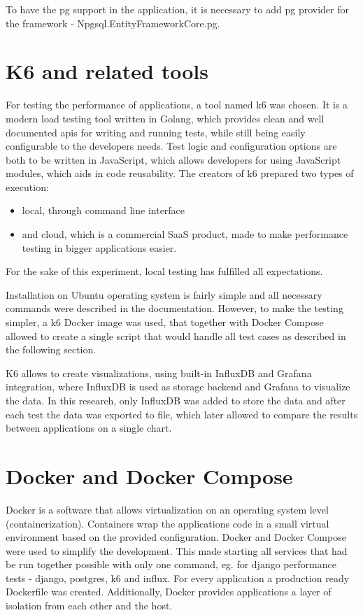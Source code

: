 To have the \acrlong{pg} support in the application, it is necessary to add \acrshort{pg} provider for the framework - Npgsql.EntityFrameworkCore.\acrlong{pg}.

\section{K6 and related tools}

For testing the performance of applications, a tool named k6 was chosen. It is a modern load testing tool written in Golang, which provides clean and well documented \acrshort{api}s for writing and running tests, while still being easily configurable to the developers needs. Test logic and configuration options are both to be written in JavaScript, which allows developers for using JavaScript modules, which aids in code reusability. The creators of k6 prepared two types of execution:
\begin{itemize}
  \item local, through command line interface
  \item and cloud, which is a commercial SaaS product, made to make performance testing in bigger applications easier.
\end{itemize}
For the sake of this experiment, local testing has fulfilled all expectations.

Installation on Ubuntu operating system is fairly simple and all necessary commands were described in the documentation. However, to make the testing simpler, a k6 Docker image was used, that together with Docker Compose allowed to create a single script that would handle all test cases as described in the following section.

K6 allows to create visualizations, using built-in InfluxDB and Grafana integration, where InfluxDB is used as storage backend and Grafana to visualize the data. In this research, only InfluxDB was added to store the data and after each test the data was exported to file, which later allowed to compare the results between applications on a single chart.

\section{Docker and Docker Compose}

Docker is a software that allows virtualization on an operating system level (containerization). Containers wrap the applications code in a small virtual environment based on the provided configuration. Docker and Docker Compose were used to simplify the development. This made starting all services that had be run together possible with only one command, eg. for django performance tests - django, postgres, k6 and influx. For every application a production ready Dockerfile was created. Additionally, Docker provides applications a layer of isolation from each other and the host.
